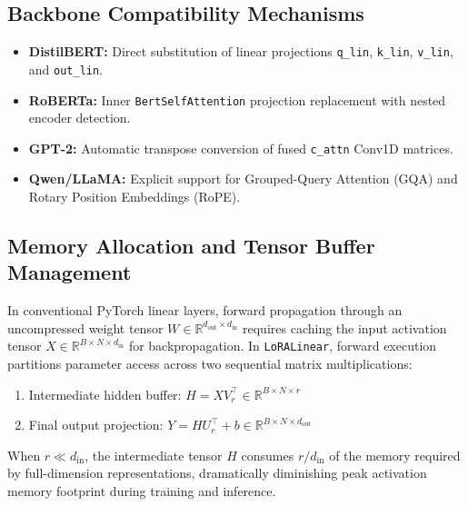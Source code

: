 \subsection{Backbone Compatibility Mechanisms}
\begin{itemize}
\item \textbf{DistilBERT:} Direct substitution of linear projections \texttt{q\_lin}, \texttt{k\_lin}, \texttt{v\_lin}, and \texttt{out\_lin}.
\item \textbf{RoBERTa:} Inner \texttt{BertSelfAttention} projection replacement with nested encoder detection.
\item \textbf{GPT-2:} Automatic transpose conversion of fused \texttt{c\_attn} Conv1D matrices.
\item \textbf{Qwen/LLaMA:} Explicit support for Grouped-Query Attention (GQA) and Rotary Position Embeddings (RoPE).
\end{itemize}

\subsection{Memory Allocation and Tensor Buffer Management}
In conventional PyTorch linear layers, forward propagation through an uncompressed weight tensor $W \in \mathbb{R}^{d_{\text{out}} \times d_{\text{in}}}$ requires caching the input activation tensor $X \in \mathbb{R}^{B \times N \times d_{\text{in}}}$ for backpropagation. In \texttt{LoRALinear}, forward execution partitions parameter access across two sequential matrix multiplications:
\begin{enumerate}
\item Intermediate hidden buffer: $H = X V_r^\top \in \mathbb{R}^{B \times N \times r}$
\item Final output projection: $Y = H U_r^\top + b \in \mathbb{R}^{B \times N \times d_{\text{out}}}$
\end{enumerate}
When $r \ll d_{\text{in}}$, the intermediate tensor $H$ consumes $r / d_{\text{in}}$ of the memory required by full-dimension representations, dramatically diminishing peak activation memory footprint during training and inference.


